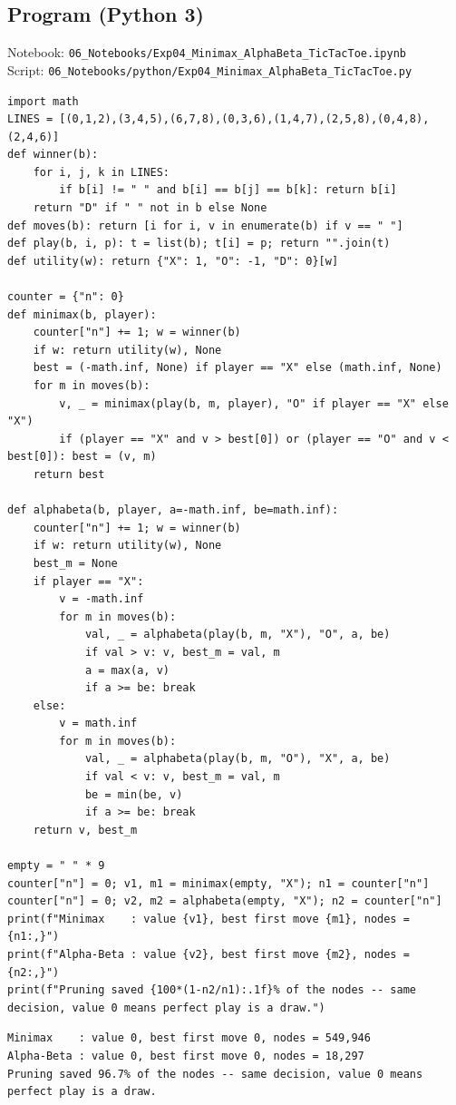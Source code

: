 \documentclass[11pt]{article}
\begin{document}
\subsection*{Program (Python 3)}
{\small\color{slate}Notebook: \texttt{06\_Notebooks/Exp04\_Minimax\_AlphaBeta\_TicTacToe.ipynb}\\ Script: \texttt{06\_Notebooks/python/Exp04\_Minimax\_AlphaBeta\_TicTacToe.py}}
\begin{lstlisting}[style=py]
import math
LINES = [(0,1,2),(3,4,5),(6,7,8),(0,3,6),(1,4,7),(2,5,8),(0,4,8),(2,4,6)]
def winner(b):
    for i, j, k in LINES:
        if b[i] != " " and b[i] == b[j] == b[k]: return b[i]
    return "D" if " " not in b else None
def moves(b): return [i for i, v in enumerate(b) if v == " "]
def play(b, i, p): t = list(b); t[i] = p; return "".join(t)
def utility(w): return {"X": 1, "O": -1, "D": 0}[w]

counter = {"n": 0}
def minimax(b, player):
    counter["n"] += 1; w = winner(b)
    if w: return utility(w), None
    best = (-math.inf, None) if player == "X" else (math.inf, None)
    for m in moves(b):
        v, _ = minimax(play(b, m, player), "O" if player == "X" else "X")
        if (player == "X" and v > best[0]) or (player == "O" and v < best[0]): best = (v, m)
    return best

def alphabeta(b, player, a=-math.inf, be=math.inf):
    counter["n"] += 1; w = winner(b)
    if w: return utility(w), None
    best_m = None
    if player == "X":
        v = -math.inf
        for m in moves(b):
            val, _ = alphabeta(play(b, m, "X"), "O", a, be)
            if val > v: v, best_m = val, m
            a = max(a, v)
            if a >= be: break
    else:
        v = math.inf
        for m in moves(b):
            val, _ = alphabeta(play(b, m, "O"), "X", a, be)
            if val < v: v, best_m = val, m
            be = min(be, v)
            if a >= be: break
    return v, best_m

empty = " " * 9
counter["n"] = 0; v1, m1 = minimax(empty, "X"); n1 = counter["n"]
counter["n"] = 0; v2, m2 = alphabeta(empty, "X"); n2 = counter["n"]
print(f"Minimax    : value {v1}, best first move {m1}, nodes = {n1:,}")
print(f"Alpha-Beta : value {v2}, best first move {m2}, nodes = {n2:,}")
print(f"Pruning saved {100*(1-n2/n1):.1f}% of the nodes -- same decision, value 0 means perfect play is a draw.")
\end{lstlisting}
\begin{lstlisting}[style=out]
Minimax    : value 0, best first move 0, nodes = 549,946
Alpha-Beta : value 0, best first move 0, nodes = 18,297
Pruning saved 96.7% of the nodes -- same decision, value 0 means perfect play is a draw.
\end{lstlisting}
\end{document}
